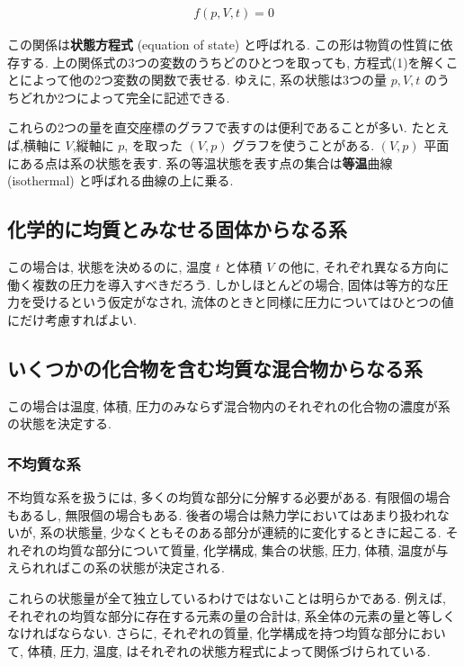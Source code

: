 \begin{align}\tag{1}
 f(p,V,t)=0
\end{align}

この関係は\textbf{状態方程式} (equation of state) と呼ばれる. この形は物質の性質に依存する. 上の関係式の3つの変数のうちどのひとつを取っても, 方程式(1)を解くことによって他の2つ変数の関数で表せる. ゆえに, 系の状態は3つの量 $p,V,t$ のうちどれか2つによって完全に記述できる.\par
これらの2つの量を直交座標のグラフで表すのは便利であることが多い. たとえば,横軸に $V$,縦軸に $p$, を取った $(V,p)$ グラフを使うことがある. $(V,p)$ 平面にある点は系の状態を表す. 系の等温状態を表す点の集合は\textbf{等温}曲線 (isothermal) と呼ばれる曲線の上に乗る.

\subsection*{化学的に均質とみなせる固体からなる系}
この場合は, 状態を決めるのに, 温度 $t$ と体積 $V$ の他に, それぞれ異なる方向に働く複数の圧力を導入すべきだろう. しかしほとんどの場合, 固体は等方的な圧力を受けるという仮定がなされ, 流体のときと同様に圧力についてはひとつの値にだけ考慮すればよい.

\subsection*{いくつかの化合物を含む均質な混合物からなる系}
この場合は温度, 体積, 圧力のみならず混合物内のそれぞれの化合物の濃度が系の状態を決定する.

\subsubsection*{不均質な系}
不均質な系を扱うには, 多くの均質な部分に分解する必要がある. 有限個の場合もあるし, 無限個の場合もある. 後者の場合は熱力学においてはあまり扱われないが, 系の状態量, 少なくともそのある部分が連続的に変化するときに起こる. それぞれの均質な部分について質量, 化学構成, 集合の状態, 圧力, 体積, 温度が与えられればこの系の状態が決定される. \par
これらの状態量が全て独立しているわけではないことは明らかである. 例えば, それぞれの均質な部分に存在する元素の量の合計は, 系全体の元素の量と等しくなければならない. さらに, それぞれの質量, 化学構成を持つ均質な部分において, 体積, 圧力, 温度, はそれぞれの状態方程式によって関係づけられている. 

